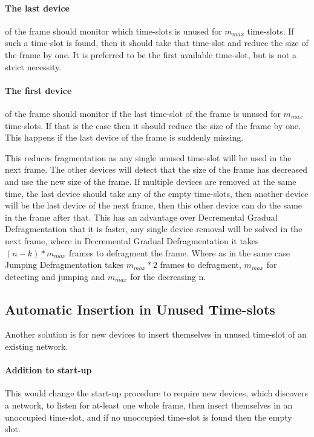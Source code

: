 \paragraph{The last device} of the frame should monitor which time-slots is unused for $m_{max}$ time-slots. 
If such a time-slot is found, then it should take that time-slot and reduce the size of the frame by one. 
It is preferred to be the first available time-slot, but is not a strict necessity.   

\paragraph{The first device} of the frame should monitor if the last time-slot of the frame is unused for $m_{max}$ time-slots.
If that is the case then it should reduce the size of the frame by one.
This happens if the last device of the frame is suddenly missing.


\bigskip

This reduces fragmentation as any single unused time-slot will be used in the next frame.
The other devices will detect that the size of the frame has decreased and use the new size of the frame. 
If multiple devices are removed at the same time, the last device should take any of the empty time-slots, then another device will be the last device of the next frame, then this other device can do the same in the frame after that. 
This has an advantage over Decremental Gradual Defragmentation that it is faster, any single device removal will be solved in the next frame, where in Decremental Gradual Defragmentation it takes $(n - k) * m_{max}$ frames to defragment the frame. 
Where as in the same case Jumping Defragmentation takes $m_{max} * 2$ frames to defragment, $m_{max}$ for detecting and jumping and $m_{max}$ for the decreasing n. 

\subsection{Automatic Insertion in Unused Time-slots}
Another solution is for new devices to insert themselves in unused time-slot of an existing network.

\paragraph{Addition to start-up}
This would change the start-up procedure to require new devices, which discovers a network, to listen for at-least one whole frame, then insert themselves in an unoccupied time-slot, and if no unoccupied time-slot is found then the empty slot. 

